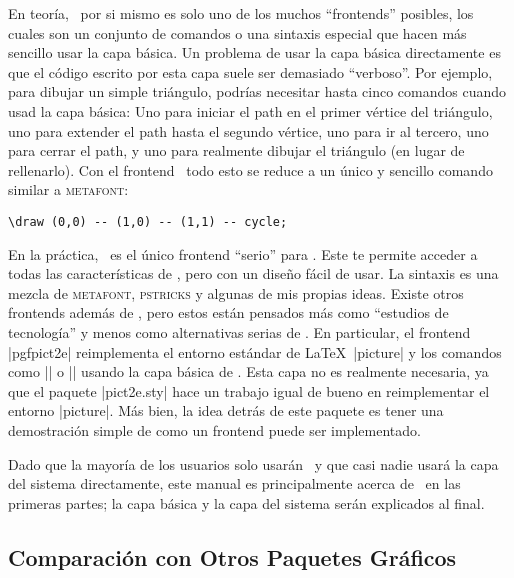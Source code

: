 En teoría, \tikzname\ por si mismo es solo uno de los muchos ``frontends''
posibles, los cuales son un conjunto de comandos o una sintaxis especial que
hacen más sencillo usar la capa básica. Un problema de usar la capa básica
directamente es que el código escrito por esta capa suele ser demasiado
``verboso''. Por ejemplo, para dibujar un simple triángulo, podrías necesitar
hasta cinco comandos cuando usad la capa básica: Uno para iniciar el path en el
primer vértice del triángulo, uno para extender el path hasta el segundo
vértice, uno para ir al tercero, uno para cerrar el path, y uno para realmente
dibujar el triángulo (en lugar de rellenarlo). Con el frontend \tikzname\  todo
esto se reduce a un único y sencillo comando similar a \textsc{metafont}:
%
\begin{verbatim}
\draw (0,0) -- (1,0) -- (1,1) -- cycle;
\end{verbatim}

En la práctica, \tikzname\ es el único frontend ``serio'' para \pgfname. Este te
permite acceder a todas las características de \pgfname, pero con un diseño
fácil de usar. La sintaxis es una mezcla de \textsc{metafont}, \textsc{pstricks}
y algunas de mis propias ideas. Existe otros frontends además de \tikzname, pero
estos están pensados más como ``estudios de tecnología'' y menos como
alternativas serias de \tikzname. En particular, el frontend |pgfpict2e|
reimplementa el entorno estándar de \LaTeX\ |{picture}| y los comandos como
|\line| o |\vector| usando la capa básica de \pgfname. Esta capa no es realmente
necesaria, ya que el paquete |pict2e.sty| hace un trabajo igual de bueno en
reimplementar el entorno |{picture}|. Más bien, la idea detrás de este paquete
es tener una demostración simple de como un frontend puede ser implementado.

Dado que la mayoría de los usuarios solo usarán \tikzname\ y que casi nadie
usará la capa del sistema directamente, este manual es principalmente acerca de
\tikzname\ en las primeras partes; la capa básica y la capa del sistema serán
explicados al final.

\subsection{Comparación con Otros Paquetes Gráficos}

